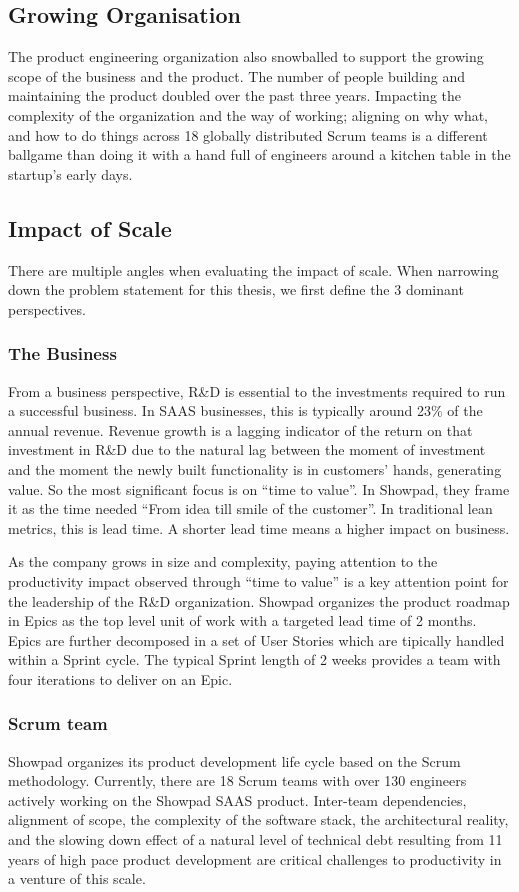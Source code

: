 \subsection{Growing Organisation}
The product engineering organization also snowballed to support the growing scope of the business and the product. The number of people building and maintaining the product doubled over the past three years. Impacting the complexity of the organization and the way of working; aligning on why what, and how to do things across 18 globally distributed \gls{Scrum} teams is a different ballgame than doing it with a hand full of engineers around a kitchen table in the startup's early days. 
\subsection{Impact of Scale}
There are multiple angles when evaluating the impact of scale. When narrowing down the problem statement for this thesis, we first define the 3 dominant perspectives.
\subsubsection{The Business}
From a business perspective, R\&D is essential to the investments required to run a successful business. In \gls{SAAS} businesses, this is typically around 23\% of the annual revenue. Revenue growth is a lagging indicator of the return on that investment in R\&D due to the natural lag between the moment of investment and the moment the newly built functionality is in customers' hands, generating value. So the most significant focus is on ``time to value''. In Showpad, they frame it as the time needed ``From idea till smile of the customer''. In traditional lean metrics, this is lead time. A shorter lead time means a higher impact on business.

As the company grows in size and complexity, paying attention to the productivity impact observed through ``time to value'' is a key attention point for the leadership of the R\&D organization. Showpad organizes the product roadmap in \glspl{Epic} as the top level unit of work with a targeted lead time of 2 months. \Glspl{Epic} are further decomposed in a set of User Stories which are tipically handled within a \gls{Sprint} cycle. The typical \gls{Sprint} length of 2 weeks provides a team with four iterations to deliver on an \gls{Epic}.
\subsubsection{Scrum team}
Showpad organizes its product development life cycle based on the \gls{Scrum} methodology. Currently, there are 18 \gls{Scrum} teams with over 130 engineers actively working on the Showpad \gls{SAAS} product. 
Inter-team dependencies, alignment of scope, the complexity of the software stack, the architectural reality, and the slowing down effect of a natural level of technical debt resulting from 11 years of high pace product development are critical challenges to productivity in a venture of this scale.
